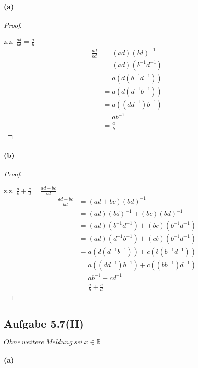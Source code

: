 \paragraph{(a)}
\begin{proof}
$ $\newline

z.z. $\frac{ad}{bd}=\frac{a}{b}$
\begin{align*}
\frac{ad}{bd}
&=(ad)(bd)^{-1}\\
&=(ad)(b^{-1}d^{-1})\\
&=a(d(b^{-1}d^{-1}))\\
&=a(d(d^{-1}b^{-1}))\\
&=a((dd^{-1})b^{-1})\\
&=ab^{-1}\\
&=\frac{a}{b}
\end{align*}
\end{proof}

\paragraph{(b)}
\begin{proof}
$ $\newline

z.z. $\frac{a}{b}+\frac{c}{d}=\frac{ad+bc}{bd}$
\begin{align*}
\frac{ad+bc}{bd}
&=(ad+bc)(bd)^{-1}\\
&=(ad)(bd)^{-1}+(bc)(bd)^{-1}\\
&=(ad)(b^{-1}d^{-1})+(bc)(b^{-1}d^{-1})\\
&=(ad)(d^{-1}b^{-1})+(cb)(b^{-1}d^{-1})\\
&=a(d(d^{-1}b^{-1}))+c(b(b^{-1}d^{-1}))\\
&=a((dd^{-1})b^{-1})+c((bb^{-1})d^{-1})\\
&=ab^{-1}+cd^{-1}\\
&=\frac{a}{b}+\frac{c}{d}
\end{align*}
\end{proof}

\newpage

\subsection{Aufgabe 5.7(H)}

$Ohne\ weitere\ Meldung\ sei\ x\in\mathbb{R}$

\paragraph{(a)}
$ $\newline

